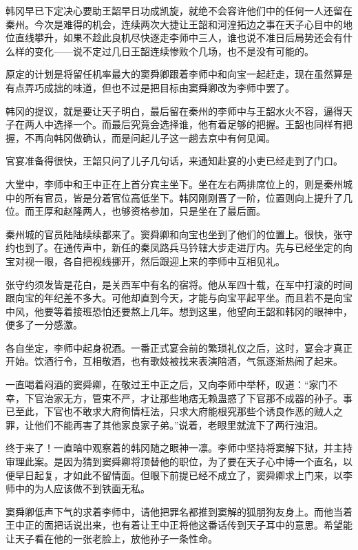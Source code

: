 韩冈早已下定决心要助王韶早日功成凯旋，就绝不会容许他们中的任何一人还留在秦州。今次是难得的机会，连续两次大捷让王韶和河湟拓边之事在天子心目中的地位直线攀升，如果不趁此良机尽快逐走李师中三人，谁也说不准日后局势还会有什么样的变化——说不定过几日王韶连续惨败个几场，也不是没有可能的。

原定的计划是将留任机率最大的窦舜卿跟着李师中和向宝一起赶走，现在虽然算是有点弄巧成拙的味道，但也不过是把目标由窦舜卿改为李师中罢了。

韩冈的提议，就是要让天子明白，最后留在秦州的李师中与王韶水火不容，逼得天子在两人中选择一个。而最后究竟会选择谁，他有着足够的把握。王韶也同样有把握，不再向韩冈做确认，而是问起儿子这一趟去京中有何见闻。

官宴准备得很快，王韶只问了儿子几句话，来通知赴宴的小吏已经走到了门口。

大堂中，李师中和王中正在上首分宾主坐下。坐在左右两排席位上的，则是秦州城中的所有官员，皆是分着官位高低坐下。韩冈刚刚晋了一阶，位置则向上提升了几位。而王厚和赵隆两人，也够资格参加，只是坐在了最后面。

秦州城的官员陆陆续续都来了。窦舜卿和向宝也坐到了他们的位置上。很快，张守约也到了。在通传声中，新任的秦凤路兵马钤辖大步走进厅内。先与已经坐定的向宝对视一眼，各自把视线挪开，然后跟迎上来的李师中互相见礼。

张守约须发皆是花白，是关西军中有名的宿将。他从军四十载，在军中打滚的时间跟向宝的年纪差不多大。可他却直到今天，才能与向宝平起平坐。而且若不是向宝中风，他要等着接班恐怕还要熬上几年。想到这里，他望向王韶和韩冈的眼神中，便多了一分感激。

各自坐定，李师中起身祝酒。一番正式宴会前的繁琐礼仪之后，这时，宴会才真正开始。饮酒行令，互相敬酒，也有歌妓被找来表演陪酒，气氛逐渐热闹了起来。

一直喝着闷酒的窦舜卿，在敬过王中正之后，又向李师中举杯，叹道：“家门不幸，下官治家无方，管束不严，才让那些地痞无赖蛊惑了下官那不成器的孙子。事已至此，下官也不敢求大府徇情枉法，只求大府能根究那些个诱良作恶的贼人之罪，让他们不能再害了其他家良家子弟。”说着，老眼里就流下了两行浊泪。

终于来了！一直暗中观察着的韩冈随之眼神一凛。李师中坚持将窦解下狱，并主持审理此案。是因为猜到窦舜卿将顶替他的职位，为了要在天子心中博一个直名，以便早日起复，才如此不留情面。但眼下前提已经不成立了，窦舜卿求上门来，以李师中的为人应该做不到铁面无私。

窦舜卿低声下气的求着李师中，请他把罪名都推到窦解的狐朋狗友身上。而他当着王中正的面把话说出来，也有着让王中正将他这番话传到天子耳中的意思。希望能让天子看在他的一张老脸上，放他孙子一条性命。

